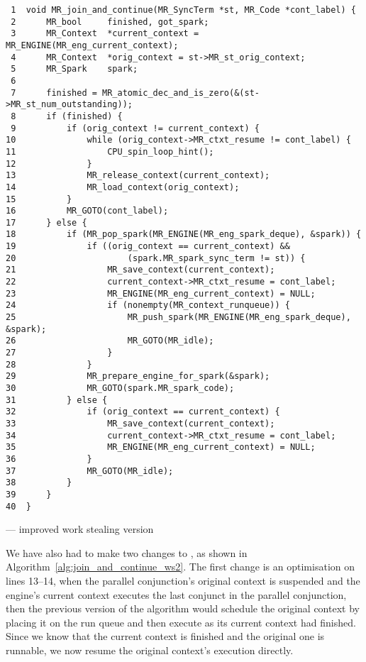 \begin{algorithm}[tbp]
\begin{verbatim}
 1  void MR_join_and_continue(MR_SyncTerm *st, MR_Code *cont_label) {
 2      MR_bool     finished, got_spark;
 3      MR_Context  *current_context = MR_ENGINE(MR_eng_current_context);
 4      MR_Context  *orig_context = st->MR_st_orig_context;
 5      MR_Spark    spark;
 6
 7      finished = MR_atomic_dec_and_is_zero(&(st->MR_st_num_outstanding));
 8      if (finished) {
 9          if (orig_context != current_context) {
10              while (orig_context->MR_ctxt_resume != cont_label) {
11                  CPU_spin_loop_hint();
12              }
13              MR_release_context(current_context);
14              MR_load_context(orig_context);
15          }
16          MR_GOTO(cont_label);
17      } else {
18          if (MR_pop_spark(MR_ENGINE(MR_eng_spark_deque), &spark)) {
19              if ((orig_context == current_context) &&
20                      (spark.MR_spark_sync_term != st)) {
21                  MR_save_context(current_context);
22                  current_context->MR_ctxt_resume = cont_label;
23                  MR_ENGINE(MR_eng_current_context) = NULL;
24                  if (nonempty(MR_context_runqueue)) {
25                      MR_push_spark(MR_ENGINE(MR_eng_spark_deque), &spark);
26                      MR_GOTO(MR_idle);
27                  }
28              }
29              MR_prepare_engine_for_spark(&spark);
30              MR_GOTO(spark.MR_spark_code);
31          } else {
32              if (orig_context == current_context) {
33                  MR_save_context(current_context);
34                  current_context->MR_ctxt_resume = cont_label;
35                  MR_ENGINE(MR_eng_current_context) = NULL;
36              }
37              MR_GOTO(MR_idle);
38          }
39      }
40  }
\end{verbatim}
\caption{\joinandcontinue --- improved work stealing version}
\label{alg:join_and_continue_ws2}
\end{algorithm}

We have also had to make two changes to \joinandcontinue,
as shown in Algorithm~\ref{alg:join_and_continue_ws2}.
The first change is an optimisation on lines 13--14,
when the parallel conjunction's original context is suspended
and the engine's current context executes the last conjunct in the parallel
conjunction,
then the previous version of the algorithm would schedule the original
context by placing it on the run queue and then execute \idle as its current
context had finished.
Since we know that the current context is finished and the original one is
runnable,
we now resume the original context's execution directly.

